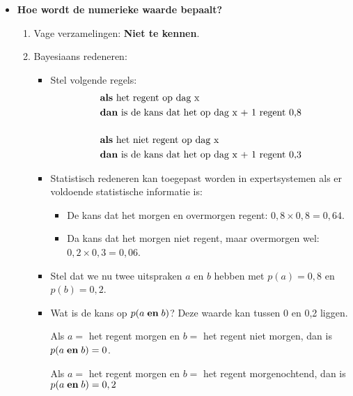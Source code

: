 \begin{itemize}
\begin{itemize}
		\item \textbf{Hoe wordt de numerieke waarde bepaalt?}
		\begin{enumerate}
			\item Vage verzamelingen: \textbf{Niet te kennen}.
			\item Bayesiaans redeneren: 
			\begin{itemize}
				\item Stel volgende regels:
				\begin{equation*}
				\begin{split}
				& \hbox{\textbf{als} het regent op dag x} \\
				& \hbox{\textbf{dan} is de kans dat het op dag x + 1 regent 0,8} 
				\\[3ex]
				& \hbox{\textbf{als} het niet regent op dag x} \\
				& \hbox{\textbf{dan} is de kans dat het op dag x + 1 regent 0,3} 
				\end{split}
				\end{equation*}
				\item Statistisch redeneren kan toegepast worden in expertsystemen als er voldoende statistische informatie is:
				\begin{itemize}
					\item De kans dat het morgen en overmorgen regent: $0,8 \times 0,8 = 0,64$.
					\item Da kans dat het morgen niet regent, maar overmorgen wel: $0,2 \times 0,3 = 0,06$.
				\end{itemize}
				\item Stel dat we nu twee uitspraken $a$ en $b$ hebben met $p(a) = 0,8$ en $p(b) = 0,2$.
				\item Wat is de kans op $p(a\; \hbox{\textbf{en}}\;b)$? Deze waarde kan tussen 0 en 0,2 liggen. 
				
				Als $a = $ het regent morgen en $b = $ het regent niet morgen, dan is $p(a\; \hbox{\textbf{en}}\;b) = 0$. 
				
				Als $a = $ het regent morgen en $b = $ het regent morgenochtend, dan is $p(a\; \hbox{\textbf{en}}\;b) = 0,2$
				

\end{itemize}
\end{enumerate}
\end{itemize}
\end{itemize}
